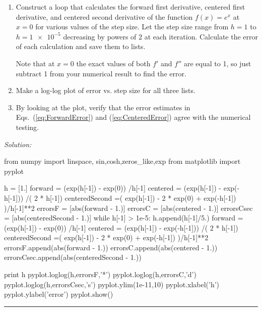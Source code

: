 \begin{enumerate}
\probtwo \label{P:DerivativeRoundoff} 
\begin{enumerate}
\item Construct a loop that calculates the forward first derivative,
  centered first derivative, and centered second derivative of the
  function $f(x) = e^x$ at $x=0$ for various values of the step size.
  Let the step size range from $h= 1$ to $ h = \num{1e-5}$ decreasing
  by powers of $2$ at each iteration. Calculate the error of each
  calculation and save them to lists.

    Note that at $x=0$ the exact values of both $f'$ and $f''$
    are equal to 1, so just subtract 1 from your numerical result
    to find the error.

\item Make a log-log plot of error vs. step size for all three lists.

\item By looking at the plot, verify that the error estimates in
    Eqs.~(\ref{eq:ForwardError}) and (\ref{eq:CenteredError})
    agree with the numerical testing.
\end{enumerate}
\end{enumerate}
\ifsolutions
\textit{Solution:}\\
\begin{codeexample}
\begin{VerbatimOut}{\listingFile}
from numpy import linspace, sin,cosh,zeros_like,exp
from matplotlib import pyplot

h = [1.]
forward = (exp(h[-1]) - exp(0)) /h[-1]
centered = (exp(h[-1]) - exp(-h[-1])) /( 2 * h[-1])
centeredSecond =( exp(h[-1]) - 2 * exp(0) + exp(-h[-1]) )/h[-1]**2
errorsF = [abs(forward - 1.)]
errorsC = [abs(centered - 1.)]
errorsCsec = [abs(centeredSecond - 1.)]
while h[-1] > 1e-5:
    h.append(h[-1]/5.)
    forward = (exp(h[-1]) - exp(0)) /h[-1]
    centered = (exp(h[-1]) - exp(-h[-1])) /( 2 * h[-1])
    centeredSecond =( exp(h[-1]) - 2 * exp(0) + exp(-h[-1]) )/h[-1]**2
    errorsF.append(abs(forward - 1.))
    errorsC.append(abs(centered - 1.))
    errorsCsec.append(abs(centeredSecond - 1.))
    
print h
pyplot.loglog(h,errorsF,'*')
pyplot.loglog(h,errorsC,'d')
pyplot.loglog(h,errorsCsec,'s')
pyplot.ylim(1e-11,10)
pyplot.xlabel('h')
pyplot.ylabel('error')
pyplot.show()
\end{VerbatimOut}
\end{codeexample}
\else
\noindent\rule{5 in}{0.01 in}
\fi

